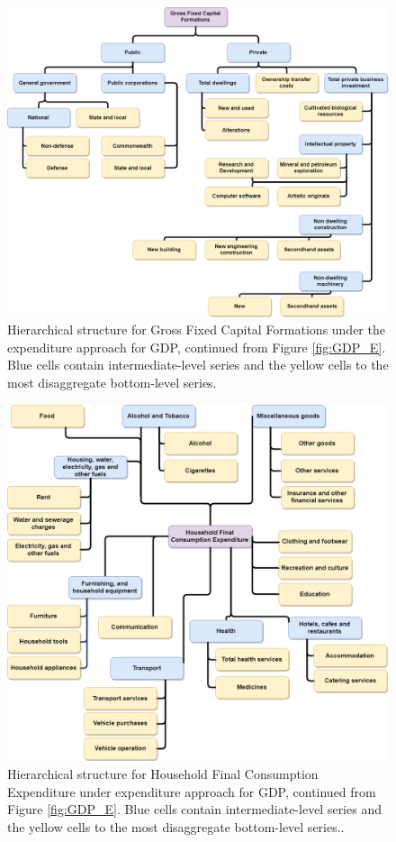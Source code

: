 \documentclass[graybox]{svmult}
\begin{document}
\begin{figure}[H]
	\centering
	\includegraphics[width=\textwidth]{Figs/GFCF.png}
	\caption{Hierarchical structure for Gross Fixed Capital Formations under the expenditure approach for GDP, continued from Figure \ref{fig:GDP_E}. Blue cells contain intermediate-level series and the yellow cells to the most disaggregate bottom-level series.}\label{fig:GFCF}
\end{figure}

\begin{figure}[H]
	\centering
	\includegraphics[width=\textwidth]{Figs/HFCE.png}
	\caption{Hierarchical structure for Household Final Consumption Expenditure under expenditure approach for GDP, continued from Figure \ref{fig:GDP_E}. Blue cells contain intermediate-level series and the yellow cells to the most disaggregate bottom-level series..}\label{fig:HFCE}
\end{figure}
\end{document}
